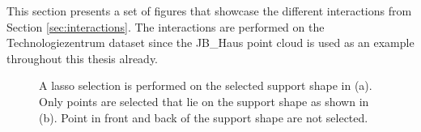 This section presents a set of figures that showcase the different interactions from Section \ref{sec:interactions}. The interactions are performed on the Technologiezentrum dataset since the JB\_Haus point cloud is used as an example throughout this thesis already. 

\begin{figure}[h]
\centering
{}
\caption[Example of an improved lasso selection]
{A lasso selection is performed on the selected support shape in (a). Only points are selected that lie on the support shape as shown in (b). Point in front and back of the support shape are not selected. }
\label{fig:technologiezentrum_lasso}
\end{figure}


